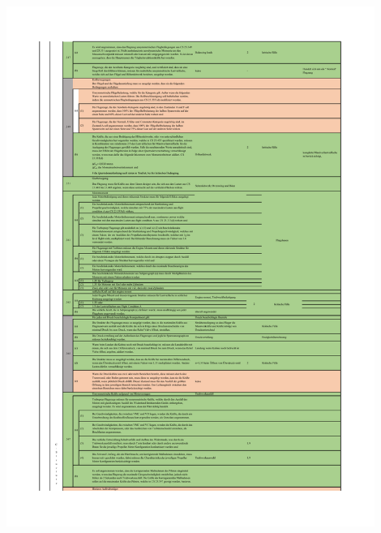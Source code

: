 \begin{table}[H]
\centering
\includegraphics[width=0.9\textwidth]{bilder/Tabellen/MPP_Konstruktion_3.pdf}
\end{table}

